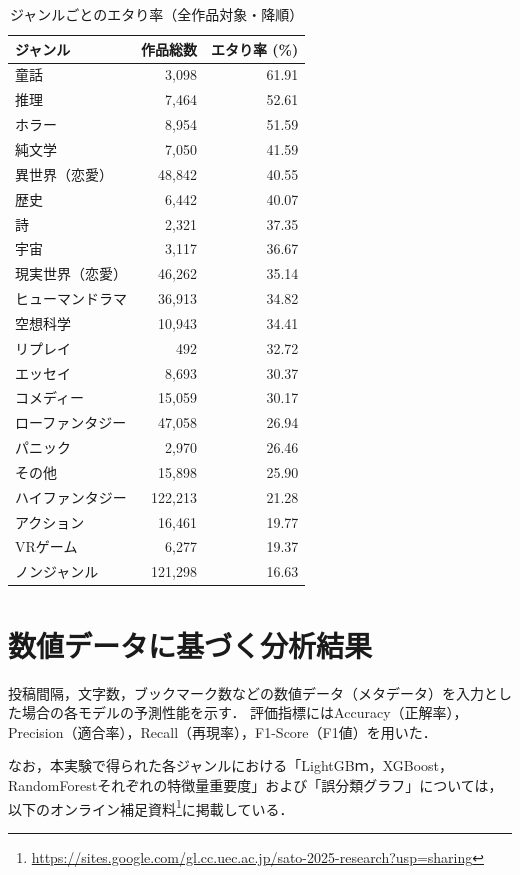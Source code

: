 \documentclass[uplatex, dvipdfmx, 11pt, a4paper, report]{jsbook}
\begin{document}
\clearpage
\begin{table}[H]
  \centering
  \caption{ジャンルごとのエタり率（全作品対象・降順）}
  \label{tab:eternal_rate}
  \begin{tabular}{lrr} \hline
    ジャンル & 作品総数 & エタり率 (\%) \\ \hline
    童話 & 3,098 & 61.91 \\
    推理 & 7,464 & 52.61 \\
    ホラー & 8,954 & 51.59 \\
    純文学 & 7,050 & 41.59 \\
    異世界（恋愛） & 48,842 & 40.55 \\
    歴史 & 6,442 & 40.07 \\
    詩 & 2,321 & 37.35 \\
    宇宙 & 3,117 & 36.67 \\
    現実世界（恋愛） & 46,262 & 35.14 \\
    ヒューマンドラマ & 36,913 & 34.82 \\
    空想科学 & 10,943 & 34.41 \\
    リプレイ & 492 & 32.72 \\
    エッセイ & 8,693 & 30.37 \\
    コメディー & 15,059 & 30.17 \\
    ローファンタジー & 47,058 & 26.94 \\
    パニック & 2,970 & 26.46 \\
    その他 & 15,898 & 25.90 \\
    ハイファンタジー & 122,213 & 21.28 \\
    アクション & 16,461 & 19.77 \\
    VRゲーム & 6,277 & 19.37 \\
    ノンジャンル & 121,298 & 16.63 \\ \hline
  \end{tabular}
\end{table}

\section{数値データに基づく分析結果}

投稿間隔，文字数，ブックマーク数などの数値データ（メタデータ）を入力とした場合の各モデルの予測性能を示す．
評価指標にはAccuracy（正解率），Precision（適合率），Recall（再現率），F1-Score（F1値）を用いた．

なお，本実験で得られた各ジャンルにおける「LightGBｍ，XGBoost，RandomForestそれぞれの特徴量重要度」および「誤分類グラフ」については，以下のオンライン補足資料\footnote{\url{https://sites.google.com/gl.cc.uec.ac.jp/sato-2025-research?usp=sharing}}に掲載している．
\end{document}
